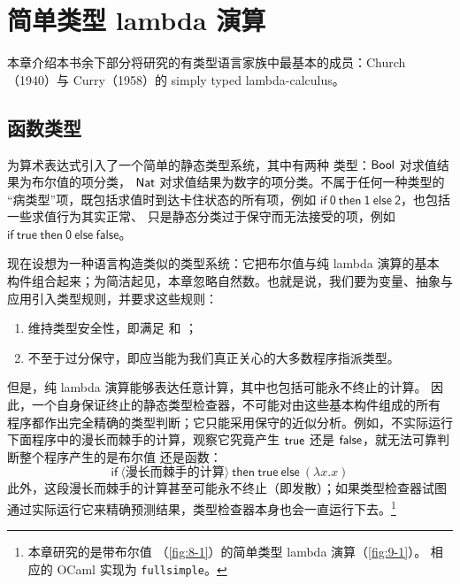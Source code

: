 
\chapter{简单类型 lambda 演算}
\label{chap:9}

本章介绍本书余下部分将研究的有类型语言家族中最基本的成员：Church
（1940）与 Curry（1958）的
{simply typed lambda-calculus}。

\section{函数类型}
\label{sec:9.1}

为算术表达式引入了一个简单的静态类型系统，其中有两种
类型：\(\mathsf{Bool}\) 对求值结果为布尔值的项分类，
\(\mathsf{Nat}\) 对求值结果为数字的项分类。不属于任何一种类型的
“病类型”项，既包括求值时到达卡住状态的所有项，例如
\(\mathsf{if\ 0\ then\ 1\ else\ 2}\)，也包括一些求值行为其实正常、
只是静态分类过于保守而无法接受的项，例如
\(\mathsf{if\ true\ then\ 0\ else\ false}\)。

现在设想为一种语言构造类似的类型系统：它把布尔值与纯 lambda 演算的基本
构件组合起来；为简洁起见，本章忽略自然数。也就是说，我们要为变量、抽象与
应用引入类型规则，并要求这些规则：
\begin{enumerate}[label=(\alph*)]
  \item 维持类型安全性，即满足
    和
    ；
  \item 不至于过分保守，即应当能为我们真正关心的大多数程序指派类型。
\end{enumerate}

但是，纯 lambda 演算能够表达任意计算，其中也包括可能永不终止的计算。
因此，一个自身保证终止的静态类型检查器，不可能对由这些基本构件组成的所有
程序都作出完全精确的类型判断；它只能采用保守的近似分析。例如，不实际运行
下面程序中的漫长而棘手的计算，观察它究竟产生
\(\mathsf{true}\) 还是 \(\mathsf{false}\)，就无法可靠判断整个程序产生的是布尔值
还是函数：
\[
\mathsf{if}\ \langle\text{漫长而棘手的计算}\rangle\
\mathsf{then\ true\ else}\ (\lambda x.x)
\]
此外，这段漫长而棘手的计算甚至可能永不终止（即发散）；如果类型检查器试图
通过实际运行它来精确预测结果，类型检查器本身也会一直运行下去。\footnote{本章研究的是带布尔值
（\cref{fig:8-1}）的简单类型 lambda 演算（\cref{fig:9-1}）。
相应的 OCaml 实现为 \texttt{fullsimple}。}

